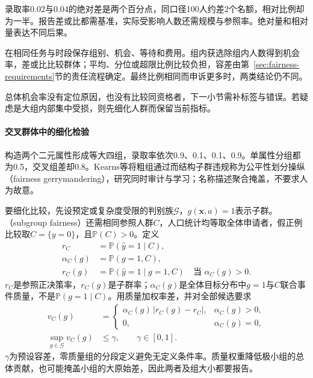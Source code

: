 录取率0.02与0.04的绝对差是两个百分点，同口径100人约差2个名额，相对比例却为一半。报告差或比都需基准，实际受影响人数还需规模与参照率。绝对量和相对量表达不同后果。

在相同任务与时段保存组别、机会、等待和费用。组内获选除组内人数得到机会率，差或比比较群体；平均、分位或超限比例比较负担，容差由第~\ref{sec:fairness-requirements}节的责任流程确定。最终比例相同而申诉更多时，两类结论仍不同。

总体机会率没有定位原因，也没有比较同资格者，下一小节需补标签与错误。若疑虑是大组内部集中受损，则先细化人群而保留当前指标。

\paragraph{交叉群体中的细化检验}

构造两个二元属性形成等大四组，录取率依次0.9、0.1、0.1、0.9。单属性分组都为0.5，交叉组差却0.8。Kearns等将粗组通过而结构子群违规称为公平性划分操纵（fairness gerrymandering），研究同时审计与学习；名称描述聚合掩盖，不要求人为故意。

要细化比较，先设预定或复杂度受限的判别族$\mathcal G$，$g(\bm{x},a)=1$表示子群。（subgroup fairness）还需相同参照人群$C$，人口统计均等取全体申请者，假正例比较取$C=\{y=0\}$，且$\mathbb P(C)>0$。定义
\begin{align*}
 r_C&=\mathbb P(\hat y=1\mid C),\\
 \alpha_C(g)&=\mathbb P(g=1,C),\\
 r_C(g)&=\mathbb P(\hat y=1\mid g=1,C)
 \quad\text{当 }\alpha_C(g)>0.
\end{align*}
$r_C$是参照正决策率，$r_C(g)$是子群率；$\alpha_C(g)$是全体目标分布中$g=1$与$C$联合事件质量，不是$\mathbb P(g=1\mid C)$。用质量加权率差，并对全部候选要求
\begin{equation}
 \begin{aligned}
 v_C(g)&=
 \begin{cases}
  \alpha_C(g)\,|r_C(g)-r_C|,&\alpha_C(g)>0,\\
  0,&\alpha_C(g)=0,
 \end{cases}\\
 \sup_{g\in\mathcal G}v_C(g)&\leq\gamma,\qquad \gamma\in[0,1].
 \end{aligned}
 \label{eq:fairness-subgroup-violation}
\end{equation}
$\gamma$为预设容差，零质量组的分段定义避免无定义条件率。质量权重降低极小组的总体贡献，也可能掩盖小组的大原始差，因此两者及组大小都要报告。

